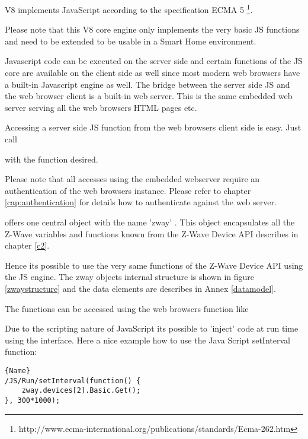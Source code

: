 
V8 implements JavaScript according to the specification ECMA 5
\footnote {http://www.ecma-international.org/publications/standards/Ecma-262.htm}.

Please note that this V8 core engine only implements the very basic JS functions and need to 
be extended to be usable in a Smart Home environment.

Javascript code can be executed on the server side and certain functions of the JS core are 
available on the client side as well since most modern web browsers have a built-in Javascript
engine as well. The bridge between the server side JS and the web browser client is a built-in
web server. This is the same embedded web server serving all the web browsers HTML pages etc.

Accessing a server side JS function from the web browsers client side is easy. Just call 
 

with the function desired.

Please note that all accesses using the embedded webserver require an authentication of the 
web browsers instance. Please refer to chapter \ref{cap:authentication} for details how to 
authenticate against the web server.

\zway offers one central object with the name 'zway' . This object encapsulates all the 
Z-Wave variables and functions known from the Z-Wave Device API describes in chapter \ref{c2}.

Hence its possible to use the very same functions of the Z-Wave Device API using the JS
engine. The zway objects internal structure is shown in figure \ref{zwaystructure} and the data elements 
are describes in Annex \ref{datamodel}.

The functions can be accessed using the web browsers function like


Due to the scripting nature of JavaScript its possible to 'inject' code at run time
using the interface. Here a nice example how to use the Java Script 
setInterval function:

\begin{lstlisting}[caption=Polling device \#2, basicstyle=\small,columns=fullflexible]{Name}
/JS/Run/setInterval(function() { 
	zway.devices[2].Basic.Get();
}, 300*1000);
\end{lstlisting}

